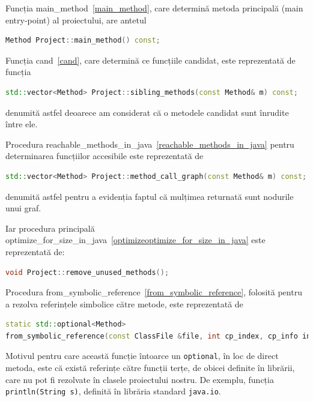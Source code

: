 Funcția main\_method~\ref{main_method}, care determină metoda
principală (main entry-point) al proiectului, are antetul
\begin{lstlisting}[language=C++]
Method Project::main_method() const;
\end{lstlisting}

Funcția cand~\ref{cand}, care determină ce funcțiile candidat, este reprezentată de funcția
\begin{lstlisting}[language=C++]
std::vector<Method> Project::sibling_methods(const Method& m) const;
\end{lstlisting}
denumită astfel deoarece am considerat că o metodele
candidat sunt înrudite între ele.

Procedura reachable\_methods\_in\_java~\ref{reachable_methods_in_java} pentru
determinarea funcțiilor accesibile este reprezentată de
\begin{lstlisting}[language=C++]
std::vector<Method> Project::method_call_graph(const Method& m) const;
\end{lstlisting}
denumită astfel pentru a evidenția faptul că mulțimea returnată sunt nodurile
unui graf.

Iar procedura principală
optimize\_for\_size\_in\_java~\ref{optimizeoptimize_for_size_in_java} este
reprezentată de:
\begin{lstlisting}[language=C++]
void Project::remove_unused_methods();
\end{lstlisting}

Procedura from\_symbolic\_reference~\ref{from_symbolic_reference}, folosită
pentru a rezolva referințele simbolice către metode, este reprezentată de
\begin{lstlisting}[language=C++]
static std::optional<Method>
from_symbolic_reference(const ClassFile &file, int cp_index, cp_info info);
\end{lstlisting}

Motivul pentru care această funcție întoarce un \texttt{optional}, în loc de
direct metoda, este că există referințe către funcții terțe, de
obicei definite în librării, care nu pot fi rezolvate în clasele proiectului nostru.
De exemplu, funcția \texttt{println(String s)}, definită în librăria standard
\texttt{java.io}.
